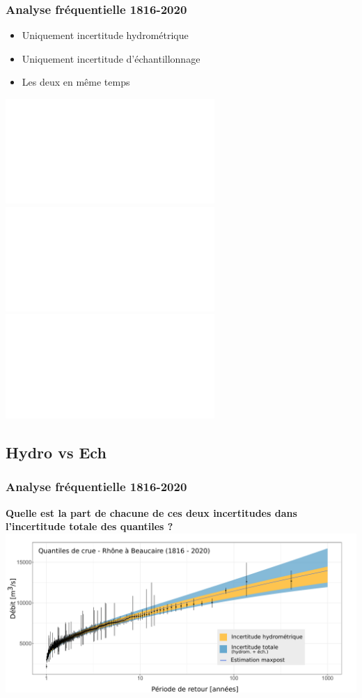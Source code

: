 \documentclass[compress,9pt]{beamer}
\begin{document}
	\begin{frame}[t]
		\frametitle{Analyse fréquentielle 1816-2020}
		\centering
		\vfill
		\begin{minipage}{0.35\textwidth}
			\begin{itemize}	
				\item<1->[$\vartriangleright$] Uniquement incertitude hydrométrique
				\vspace{0.3cm}
				\item<2->[$\vartriangleright$] Uniquement incertitude d'échantillonnage
				\vspace{0.3cm}
				\item<3->[$\vartriangleright$] Les deux en même temps\\
			\end{itemize}
		\end{minipage}
		\hfill
		\begin{minipage}{0.6\textwidth}
			\centering
			\includegraphics<1>[width = .6\textwidth]{./Figures/uPropag1.pdf}
			\includegraphics<2>[width = .6\textwidth]{./Figures/uPropag2.pdf}
			\includegraphics<3>[width = .6\textwidth]{./Figures/uPropagtot.pdf}
		\end{minipage}
		\vfill
	\end{frame}
			 
	\subsection{Hydro vs Ech}
	\begin{frame}[t]
		\frametitle{Analyse fréquentielle 1816-2020}
		\vfill		
		\centering
		\textbf{Quelle est la part de chacune de ces deux incertitudes dans l'incertitude totale des quantiles ?} 
		\vfill
		\centering
		\includegraphics[width = \textwidth]{./Figures/10a-GeV_205years.pdf} 
	\end{frame}
	
\end{document}
